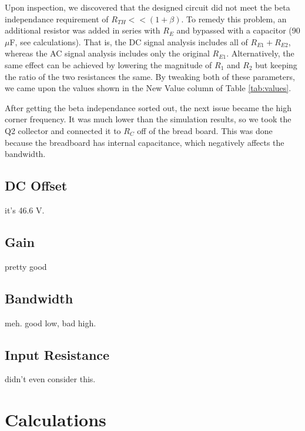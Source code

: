 \documentclass[12pt,letterpaper]{report}
\begin{document}
Upon inspection, we discovered that the designed circuit did not meet the beta independance requirement of $R_{TH} << (1 + \beta)$. To remedy this problem, an additional resistor was added in series with $R_E$ and bypassed with a capacitor (90 $\mu$F, see calculations). That is, the DC signal analysis includes all of $R_{E1}+R_{E2}$, whereas the AC signal analysis includes only the original $R_{E1}$. Alternatively, the same effect can be achieved by lowering the magnitude of $R_1$ and $R_2$ but keeping the ratio of the two resistances the same. By tweaking both of these parameters, we came upon the values shown in the New Value column of Table \ref{tab:values}.


After getting the beta independance sorted out, the next issue became the high corner frequency. It was much lower than the simulation results, so we took the Q2 collector and connected it to $R_C$ off of the bread board. This was done because the breadboard has internal capacitance, which negatively affects the bandwidth. 

\subsection*{DC Offset}

it's 46.6 V.

\subsection*{Gain}

pretty good

\subsection*{Bandwidth}

meh. good low, bad high.

\subsection*{Input Resistance}

didn't even consider this.

\section*{Calculations}
\end{document}
